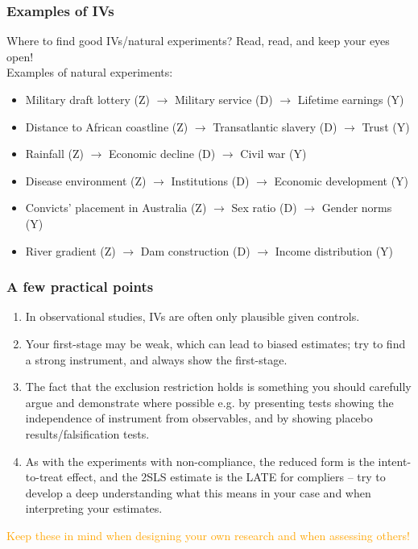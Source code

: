 \documentclass[12pt,english,dvipsnames,aspectratio=169,handout]{beamer}\usepackage[]{graphicx}\usepackage[]{xcolor}
\begin{document}
\begin{frame}
  \frametitle{Examples of IVs}
  \footnotesize 
Where to find good IVs/natural experiments? Read, read, and keep your eyes open!\\
\vspace{2mm}
Examples of natural experiments: 
  \scriptsize 
  	\begin{itemize} \scriptsize
    \item Military draft lottery (Z) $\rightarrow$ Military service (D) $\rightarrow$ Lifetime earnings (Y)\\ \cite{angrist_lifetime_1990}
    \item Distance to African coastline (Z) $\rightarrow$ Transatlantic slavery (D) $\rightarrow$ Trust (Y)\\ \cite{nunn_slave_2011}
    \item Rainfall (Z) $\rightarrow$ Economic decline (D) $\rightarrow$ Civil war (Y)\\ \cite{miguel_economic_2004}
    \item Disease environment (Z) $\rightarrow$ Institutions (D) $\rightarrow$ Economic development (Y)\\ \cite{acemoglu_colonial_2001}
    \item Convicts' placement in Australia (Z) $\rightarrow$ Sex ratio (D) $\rightarrow$ Gender norms (Y)\\ \cite{grosjean_it_2019}
    \item River gradient (Z) $\rightarrow$ Dam construction (D) $\rightarrow$ Income distribution (Y)\\ \cite{duflo_dams_2007}
  	\end{itemize}
\end{frame}

\begin{frame}
\frametitle{A few practical points}
  \footnotesize
\begin{enumerate}
  \item In observational studies, IVs are often only plausible given controls.
  \item Your first-stage may be weak, which can lead to biased estimates; try to find a strong instrument, and always show the first-stage. 
  \item The fact that the exclusion restriction holds is something you should carefully argue and demonstrate where possible e.g. by presenting tests showing the independence of instrument from observables, and by showing placebo results/falsification tests.
  \item As with the experiments with non-compliance, the reduced form is the intent-to-treat effect, and the 2SLS estimate is the LATE for compliers -- try to develop a deep understanding what this means in your case and when interpreting your estimates.
\end{enumerate}
\textcolor{orange}{Keep these in mind when designing your own research and when assessing others!}
\end{frame}
\end{document}
